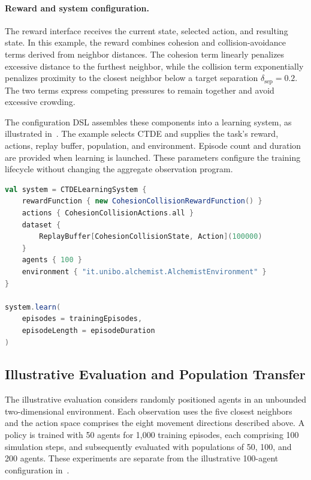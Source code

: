 \paragraph{Reward and system configuration.}
The reward interface receives the current state, selected action, and
 resulting state.
%
In this example, the reward combines cohesion and collision-avoidance
 terms derived from neighbor distances.
%
The cohesion term linearly penalizes excessive distance to the furthest
 neighbor, while the collision term exponentially penalizes proximity to
 the closest neighbor below a target separation
 $\delta_{\mathrm{sep}}=0.2$.
%
The two terms express competing pressures to remain together and avoid
 excessive crowding.

The configuration DSL assembles these components into a learning system,
 as illustrated in~.
%
The example selects CTDE and supplies the task's reward, actions, replay
 buffer, population, and environment.
%
Episode count and duration are provided when learning is launched.
%
These parameters configure the training lifecycle without changing the
 aggregate observation program.

\begin{lstlisting}[language=scala,breaklines=true,float=tbp,
  caption={Declarative configuration of a ScaRLib learning system.
   Training duration is supplied through experiment parameters.},
  label={lst:scarlib-dsl}]
val system = CTDELearningSystem {
    rewardFunction { new CohesionCollisionRewardFunction() }
    actions { CohesionCollisionActions.all }
    dataset {
        ReplayBuffer[CohesionCollisionState, Action](100000)
    }
    agents { 100 }
    environment { "it.unibo.alchemist.AlchemistEnvironment" }
}

system.learn(
    episodes = trainingEpisodes,
    episodeLength = episodeDuration
)
\end{lstlisting}

\subsection{Illustrative Evaluation and Population Transfer}
\label{sec:scarlib-evaluation}

The illustrative evaluation considers randomly positioned agents in an
 unbounded two-dimensional environment.
%
Each observation uses the five closest neighbors and the action space
 comprises the eight movement directions described above.
%
A policy is trained with 50 agents for 1,000 training episodes,
 each comprising 100 simulation steps, and subsequently evaluated with
 populations of 50, 100, and 200 agents.
%
These experiments are separate from the illustrative 100-agent
 configuration in~.

